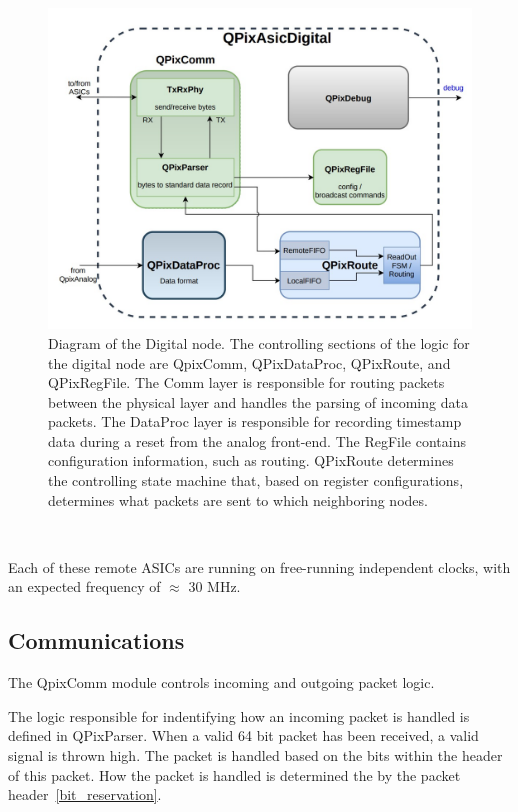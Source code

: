 \begin{figure}[]
\centering
\includegraphics[width=\textwidth]{images/digital_node_overview.jpg}
\caption{Diagram of the Digital node.
  The controlling sections of the logic for the digital node are QpixComm, QPixDataProc, QPixRoute, and QPixRegFile.
  The Comm layer is responsible for routing packets between the physical layer and handles the parsing of incoming data packets.
  The DataProc layer is responsible for recording timestamp data during a reset from the analog front-end.
  The RegFile contains configuration information, such as routing.
  QPixRoute determines the controlling state machine that, based on register configurations, determines what packets are sent to which neighboring nodes.}
\end{figure}~\label{fig:qpa_diagram}

Each of these remote ASICs are running on free-running independent clocks, with an expected frequency of $\approx$ 30 MHz.

\subsection{Communications}

The QpixComm module controls incoming and outgoing packet logic.

The logic responsible for indentifying how an incoming packet is handled is defined in QPixParser.
When a valid 64 bit packet has been received, a valid signal is thrown high.
The packet is handled based on the bits within the header of this packet.
How the packet is handled is determined the by the packet header~\ref{bit_reservation}.

